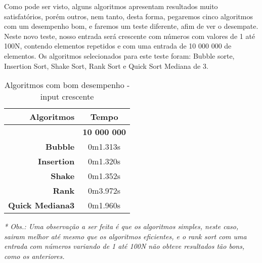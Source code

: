 \documentclass[
	12pt,				%
	oneside,			%
	a4paper,			%
	english,			%
	brazil,				%
	]{article}
\begin{document}
  Como pode ser visto, alguns algoritmos apresentam resultados muito satisfatórios, porém outros, nem tanto, desta forma, pegaremos cinco algoritmos com 
um desempenho bom, e faremos um teste diferente, afim de ver o desempate. Neste novo teste, nosso entrada será crescente com números com valores de 1 até 100N, contendo elementos repetidos 
e com uma entrada de 10 000 000 de elementos. Os algoritmos selecionados para este teste foram: Bubble sorte, Insertion Sort, Shake Sort, Rank Sort e Quick Sort Mediana de 3.\\
\begin{table}[H]
\centering
\begin{tabular}{|r|c|}
\cline{1-2} 
  \textbf{Algoritmos} & \textbf{Tempo}  \\
 \hline
 \textbf{} & \textbf{10 000 000} \\
 \hline
 \textbf{Bubble} & 0m1.313s \\
 \hline
 \textbf{Insertion} & 0m1.320s  \\
 \hline
 \textbf{Shake} & 0m1.352s \\
 \hline
 \textbf{Rank} & 0m3.972s  \\
 \hline
 \textbf{Quick Mediana3} & 0m1.960s  \\
 \hline
\end{tabular} 
\caption{Algoritmos com bom desempenho - input crescente}
\end{table}
\textit{* Obs.: Uma observação a ser feita é que os algoritmos simples, neste caso, sairam melhor até mesmo que os algoritmos eficientes, e o rank sort com uma entrada
com números variando de 1 até 100N não obteve resultados tão bons, como os anteriores.}
\end{document}

